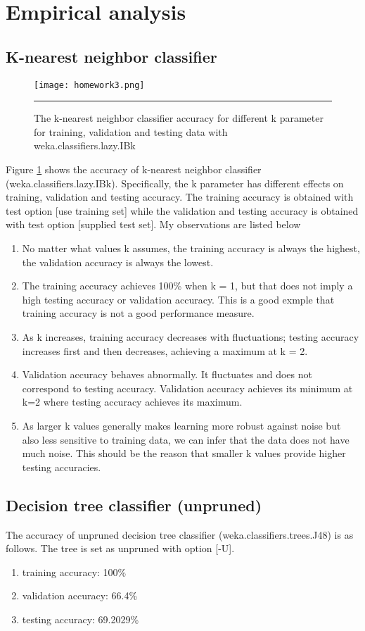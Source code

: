 \documentclass[12pt]{article}
\begin{document}
\section{Empirical analysis}
\subsection{K-nearest neighbor classifier}
\begin{figure}[htb]
  \centering
      {\texttt{[image: homework3.png]}} \rule{1\linewidth}{1pt}
      \caption{The k-nearest neighbor classifier accuracy for different k parameter for training, validation and testing data with weka.classifiers.lazy.IBk}
      \label{fig:accuracy}
\end{figure}
Figure \ref{fig:accuracy} shows the accuracy of k-nearest neighbor classifier (weka.classifiers.lazy.IBk). Specifically, the k parameter has different effects on training, validation and testing accuracy. The training accuracy is obtained with test option [use training set] while the validation and testing accuracy is obtained with test option [supplied test set]. My observations are listed below
\begin{enumerate}
\item No matter what values k assumes, the training accuracy is always the highest, the validation accuracy is always the lowest.
\item The training accuracy achieves 100\% when k = 1, but that does not imply a high testing accuracy or validation accuracy. This is a good exmple that training accuracy is not a good performance measure.
\item As k increases, training accuracy decreases with fluctuations; testing accuracy increases first and then decreases, achieving a maximum at k = 2.
\item Validation accuracy behaves abnormally. It fluctuates and does not correspond to testing accuracy. Validation accuracy achieves its minimum at k=2 where testing accuracy achieves its maximum.
\item As larger k values generally makes learning more robust against noise but also less sensitive to training data, we can infer that the data does not have much noise. This should be the reason that smaller k values provide higher testing accuracies.
\end{enumerate}
\subsection{Decision tree classifier (unpruned)}
The accuracy of unpruned decision tree classifier (weka.classifiers.trees.J48) is as follows. The tree is set as unpruned with option [-U].
\begin{enumerate}
\item training accuracy: 100\%
\item validation accuracy: 66.4\%
\item testing accuracy: 69.2029\%
\end{enumerate}
\end{document}
